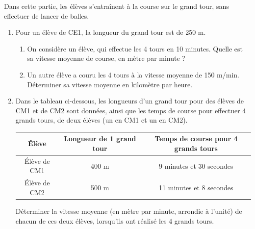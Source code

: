 \begin{activite}
\begin{QCM}
Dans cette partie, les élèves s’entraînent à la course sur le grand tour, sans effectuer de lancer de balles.
\begin{enumerate}
   \item Pour un élève de CE1, la longueur du grand tour est de 250 m.
      \begin{enumerate}
         \item On considère un élève, qui effectue les 4 tours en 10 minutes. Quelle est sa vitesse moyenne de course, en mètre par minute ?      
         \item Un autre élève a couru les 4 tours à la vitesse moyenne de 150 m/min. Déterminer sa vitesse moyenne en kilomètre par heure.
      \end{enumerate}
   \item Dans le tableau ci-dessous, les longueurs d’un grand tour pour des élèves de CM1 et de CM2 sont données, ainsi que les temps de course pour effectuer 4 grands tours, de deux élèves (un en CM1 et un en CM2). \medskip
      {\small
      \begin{center}
         \begin{tabular}{|C{2.5}|C{4.7}|C{6.5}|}
            \hline
            {\bf Élève} & {\bf Longueur de 1 grand tour} & {\bf Temps de course pour 4 grands tours} \\
            \hline
            Élève de CM1 & 400 m & 9 minutes et 30 secondes \\
            \hline
            Élève de CM2 & 500 m & 11 minutes et 8 secondes \\
            \hline
         \end{tabular}
      \end{center}}
      \medskip
      Déterminer la vitesse moyenne (en mètre par minute, arrondie à l’unité) de chacun de ces deux élèves, lorsqu’ils ont réalisé les 4 grands tours. \bigskip
   \end{enumerate}
   \end{QCM}
   
   \pagebreak
   

\end{activite}
